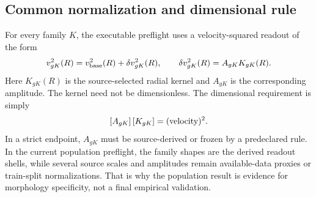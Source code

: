 \documentclass[11pt]{article}
\begin{document}
\begin{table}[H]
\centering
\caption{Logical status of the bridge-to-kernel construction.}
\scriptsize
{}
\label{tab:bridge-layer-status}
\end{table}

\subsection{Common normalization and dimensional rule}

For every family \(K\), the executable preflight uses a velocity-squared
readout of the form
\[
v_{gK}^2(R)=v_{\rm base}^2(R)+\delta v_{gK}^2(R),
\qquad
\delta v_{gK}^2(R)=A_{gK}K_{gK}(R).
\]
Here \(K_{gK}(R)\) is the source-selected radial kernel and \(A_{gK}\) is the
corresponding amplitude.  The kernel need not be dimensionless.  The
dimensional requirement is simply
\[
[A_{gK}]\,[K_{gK}]=({\rm velocity})^2 .
\]
In a strict endpoint, \(A_{gK}\) must be source-derived or frozen by a
predeclared rule.  In the current population preflight, the family shapes are
the derived readout shells, while several source scales and amplitudes remain
available-data proxies or train-split normalizations.  That is why the
population result is evidence for morphology specificity, not a final
empirical validation.
\end{document}
